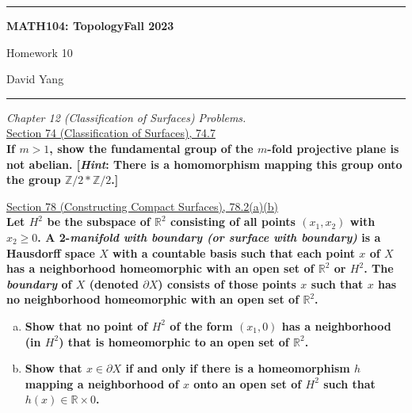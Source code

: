 \documentclass[11pt]{article}
\newcommand{\R}{\mathbb{R}}
\newcommand{\Z}{\mathbb{Z}}
\begin{document}
	\hrule
	\begin{center}
        \textbf{MATH104: Topology}\hfill \textbf{Fall 2023}\newline

		{\Large Homework 10}

		David Yang
	\end{center}

\hrule

\vspace{1em}

\textit{Chapter 12 (Classification of Surfaces) Problems.} \\

\underline{Section 74 (Classification of Surfaces), 74.7} \\

\textbf{If $m > 1$, show the fundamental group of the $m$-fold projective plane is not abelian. [\textit{Hint}: There is a homomorphism mapping this group onto the group $\Z / 2 * \Z / 2$.]}


\newpage

\underline{Section 78 (Constructing Compact Surfaces), 78.2(a)(b)} \\

\textbf{Let $H^2$ be the subspace of $\R^2$ consisting of all points $(x_1, x_2)$ with $x_2 \geq 0$. A 2-\textit{manifold with boundary (or surface with boundary)}
is a Hausdorff space $X$ with a countable basis such that each point $x$ of $X$ has a neighborhood homeomorphic with an open set of $\R^2$ or $H^2$.
The \textit{boundary} of $X$ (denoted $\partial X$) consists of those points $x$ such that $x$ has no neighborhood homeomorphic with an open set of $\R^2$.}

\begin{enumerate}[a)]
    \item \textbf{Show that no point of $H^2$ of the form $(x_1, 0)$ has a neighborhood (in $H^2$) that is homeomorphic to an open set of $\R^2$.}
    \item \textbf{Show that $x \in \partial X$ if and only if there is a homeomorphism $h$ mapping a neighborhood of $x$ onto an open set of $H^2$ such that $h(x) \in \R \times 0$.}
\end{enumerate}
\end{document}
